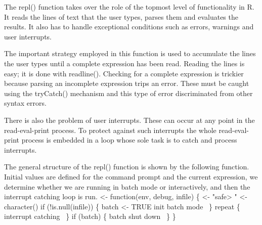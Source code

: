 \documentclass[a4paper]{article}%
\begin{document}
The {\Tt{}repl()\nwendquote} function takes over the role of the topmost level of
functionality in R.  It reads the lines of text that the user types,
parses them and evaluates the results.  It also has to handle
exceptional conditions such as errors, warnings and user interrupts.

The important strategy employed in this function
is used to accumulate the lines the user types
until a complete expression has been read.  Reading the lines is easy;
it is done with {\Tt{}readline()\nwendquote}.  Checking for a complete expression
is trickier because parsing an incomplete expression trips an error.
These must be caught using the {\Tt{}tryCatch()\nwendquote} mechanism and this
type of error discriminated from other syntax errors.

There is also the problem of user interrupts.  These can occur at any
point in the read-eval-print process. To protect against such
interrupts the whole read-eval-print process is embedded in a loop
whose sole task is to catch and process interrupts.

The general structure of the {\Tt{}repl()\nwendquote} function is shown by the
following function.  Initial values are defined for the
command prompt and the current expression, we determine whether
we are running in batch mode or interactively, and then the interrupt
catching loop is run.
\nwenddocs{}\endmoddef\nwstartdeflinemarkup{}\nwenddeflinemarkup
{} <- function(env, debug, infile) \{
     <- "safe> "
     <- character()
    if (!is.null(infile)) \{
        batch <- TRUE
        \LA{}init batch mode~{\nwtagstyle{}}\RA{}
    \}
    repeat \{
        \LA{}interrupt catching~{\nwtagstyle{}}\RA{}
    \}
    if (batch) \{
        \LA{}batch shut down~{\nwtagstyle{}}\RA{}
    \}
\}
\end{document}
